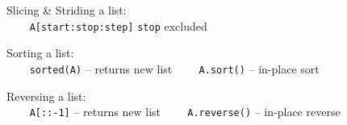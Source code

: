 Slicing \& Striding a list:\\
{\ex \lstinline|    A[start:stop:step]|} \lstinline|stop| excluded

Sorting a list:\\
{\ex \lstinline|    sorted(A)|} -- returns new list
{\ex \lstinline|    A.sort()|} -- in-place sort

Reversing a list:\\
{\ex \lstinline|    A[::-1]|} -- returns new list
{\ex \lstinline|    A.reverse()|} -- in-place reverse
